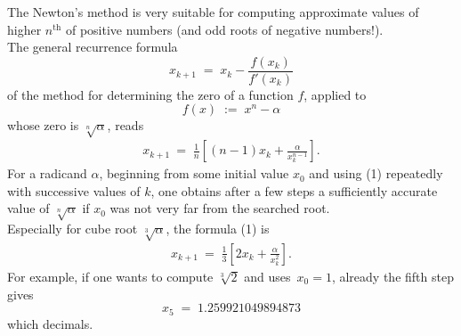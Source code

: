 \documentclass[12pt]{article}
\theoremstyle{definition}
\begin{document}
The Newton's method is very suitable for computing approximate values of higher $n^{\mathrm{th}}$  of positive numbers (and odd roots of negative numbers!).\\

The general recurrence formula 
$$x_{k+1} \;=\; x_k-\frac{f(x_k)}{f'(x_k)}$$
of the method for determining the zero of a function $f$, applied to 
$$f(x) \;:=\; x^n\!-\!\alpha$$
whose zero is $\sqrt[n]{\alpha}$, reads
\begin{align}
x_{k+1} \:=\; \frac{1}{n}\left[(n\!-\!1)x_k+\frac{\alpha}{x_k^{n-1}}\right].
\end{align}
For a radicand $\alpha$, beginning from some initial value $x_0$ and using (1) repeatedly with successive values of 
$k$, one obtains after a few steps a sufficiently accurate value of $\sqrt[n]{\alpha}$ if $x_0$ was not very far from the searched root.\\

Especially for cube root $\sqrt[3]{\alpha}$, the formula (1) is
\begin{align}
x_{k+1} \:=\; \frac{1}{3}\left[2x_k+\frac{\alpha}{x_k^2}\right].
\end{align}
For example, if one wants to compute $\sqrt[3]{2}$ and uses\, $x_0 = 1$, already the fifth step gives 
$$x_5 \;=\; 1.259921049894873$$
which  decimals.

\end{document}

